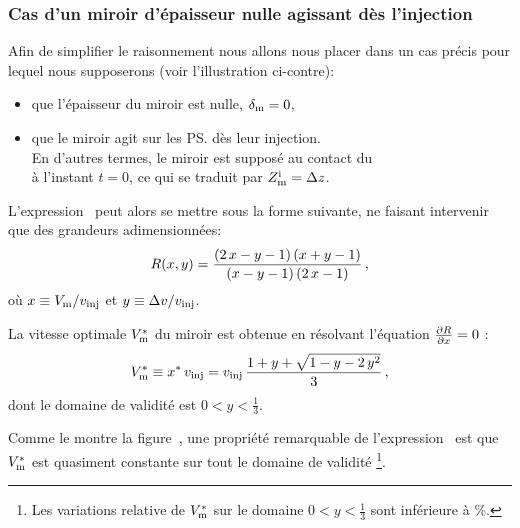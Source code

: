 \subsubsection{Cas d'un miroir d'épaisseur nulle agissant dès l'injection}
Afin de simplifier le raisonnement nous allons nous placer dans un cas précis pour lequel nous supposerons (voir l'illustration ci-contre):
\begin{itemize}
	\item que l'épaisseur du miroir est nulle, ${\delta_{\rm m}}=0$,
	\item que le miroir agit sur les \ps dès leur injection. \\ En d'autres termes, le miroir est supposé au contact du \\\p à l'instant $t=0$, ce qui se traduit par $Z_{\mathrm {m}}^{\mathrm i}={\Delta z}$.
\end{itemize}
L'expression~ peut alors se mettre sous la forme suivante, ne faisant intervenir que des grandeurs adimensionnées:
\begin{equation}
\Rmax(x,y) = 
\frac{ \left( 2\,x-y-1 \right)  \left( x+y-1 \right) }{ \left( x
-y-1 \right)  \left( 2\,x-1 \right) }\\
\virguleformule
	\label{eq:RmaxSimple}
\end{equation}
où $x\equiv {{V_{\rm {m}}} / {v_{{\rm {inj}}}}}$ et $y\equiv {{{\Delta v}} / {v_{{\rm {inj}}}}}$. 

\casse

\noindent
La vitesse optimale ${V_{\rm {m}}^\ast}$ du miroir est obtenue en résolvant l'équation $\frac{\partial R}{\partial x}=0$ :
\begin{equation}
	\Vmiropt \equiv x^\ast \, \vinj = \vinj\,\frac{1+y+\sqrt {1-y-2\,y^{2}}}{3}
	\virguleformule
	\label{eq:VmirOpt}
\end{equation}
dont le domaine de validité est $0<y<\frac{1}{3}$.

Comme le montre la figure~, une propriété remarquable de l'expression~ est que ${V_{\rm {m}}^\ast}$ est quasiment constante sur tout le domaine de validité%
\footnote{Les variations relative de ${V_{\rm {m}}^\ast}$ sur le domaine $0<y<\frac{1}{3}$ sont inférieure à \%.}.%
\bfighss
{}
\,\,
\efigh

